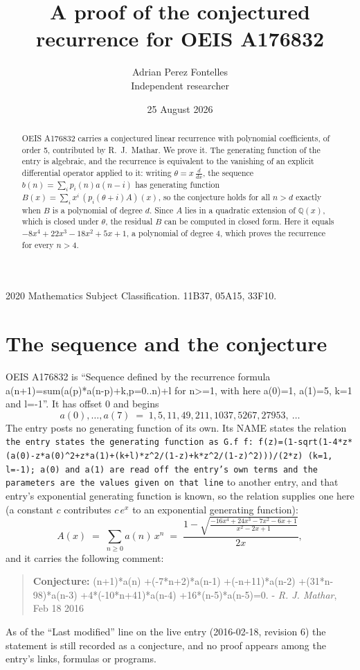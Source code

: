 \documentclass[11pt,a4paper]{article}
\title{A proof of the conjectured recurrence for OEIS A176832}
\author{Adrian Perez Fontelles\\ \small Independent researcher}
\date{25 August 2026}
\theoremstyle{plain}
\theoremstyle{definition}
\begin{document}
\maketitle

\begin{abstract}
OEIS A176832 carries a conjectured linear recurrence with polynomial coefficients, of
order 5, contributed by R.~J.~Mathar. We prove it. The generating function of the
entry is algebraic, and the recurrence is equivalent to the vanishing of an explicit
differential operator applied to it: writing $\theta=x\,\frac{d}{dx}$, the sequence
$b(n)=\sum_{i}p_{i}(n)a(n-i)$ has generating function
$B(x)=\sum_{i}x^{i}\,(p_{i}(\theta+i)A)(x)$, so the conjecture holds for all $n>d$ exactly
when $B$ is a polynomial of degree $d$. Since $A$ lies in a quadratic extension of
$\mathbb{Q}(x)$, which is closed under $\theta$, the residual $B$ can be computed in
closed form. Here it equals $- 8 x^{4} + 22 x^{3} - 18 x^{2} + 5 x + 1$, a polynomial of degree $4$, which proves
the recurrence for every $n>4$.
\end{abstract}

\noindent\small 2020 Mathematics Subject Classification. 11B37, 05A15, 33F10.\normalsize

\section{The sequence and the conjecture}

OEIS A176832 is ``Sequence defined by the recurrence formula a(n+1)=sum(a(p)*a(n-p)+k,p=0..n)+l for n>=1, with here a(0)=1, a(1)=5, k=1 and l=-1''. It has offset $0$ and begins
\[
a(0),\dots,a(7)\;=\;1, 5, 11, 49, 211, 1037, 5267, 27953,\ \dots
\]
The entry posts no generating function of its own. Its NAME states the
relation \texttt{the entry states the generating function as G.f f: f(z)=(1-sqrt(1-4*z*(a(0)-z*a(0)\textasciicircum{}2+z*a(1)+(k+l)*z\textasciicircum{}2/(1-z)+k*z\textasciicircum{}2/(1-z)\textasciicircum{}2)))/(2*z) (k=1, l=-1); a(0) and a(1) are read off the entry's own terms and the parameters are the values given on that line} to another entry, and that entry's exponential generating
function is known, so the relation supplies one here (a constant $c$ contributes
$c\,e^{x}$ to an exponential generating function):
\begin{equation}\label{eq:gf}
A(x)\;=\;\sum_{n\ge 0} a(n)\,x^{n}\;=\;\frac{1 - \sqrt{\frac{- 16 x^{4} + 24 x^{3} - 7 x^{2} - 6 x + 1}{x^{2} - 2 x + 1}}}{2 x} ,
\end{equation}
and it carries the following comment:
\begin{quote}\small
\textbf{Conjecture:} (n+1)*a(n) +(-7*n+2)*a(n-1) +(-n+11)*a(n-2) +(31*n-98)*a(n-3) +4*(-10*n+41)*a(n-4) +16*(n-5)*a(n-5)=0. - \emph{R. J. Mathar}, Feb 18 2016
\end{quote}
As of the ``Last modified'' line on the live entry (2016-02-18, revision 6) the
statement is still recorded as a conjecture, and no proof appears among the entry's links,
formulas or programs.
\end{document}
